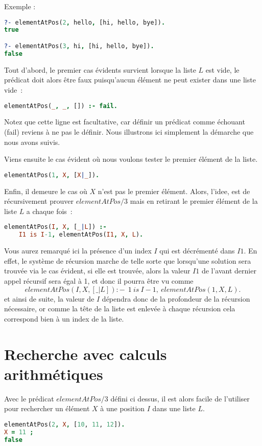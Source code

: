 Exemple :
\begin{lstlisting}[language=Prolog,frame=single]
?- elementAtPos(2, hello, [hi, hello, bye]).
true

?- elementAtPos(3, hi, [hi, hello, bye]).
false
\end{lstlisting}


Tout d'abord, le premier cas évidents survient lorsque la liste $L$ est vide, le
prédicat doit alors être faux puisqu'aucun élément ne peut exister dans une liste vide~:
\begin{lstlisting}[language=Prolog,frame=single]
elementAtPos(_, _, []) :- fail.
\end{lstlisting}
Notez que cette ligne est facultative, car définir un prédicat comme échouant
(fail) reviens à ne pas le définir. Nous illustrons ici simplement la démarche que nous avons suivis.

Viens ensuite le cas évident où nous voulons tester le premier élément de la
liste.
\begin{lstlisting}[language=Prolog,frame=single]
elementAtPos(1, X, [X|_]).
\end{lstlisting}

Enfin, il demeure le cas où $X$ n'est pas le premier élément. Alors, l'idee, est
de récursivement prouver $elementAtPos/3$ mais en retirant le premier élément de la liste $L$
a chaque fois~:
\begin{lstlisting}[language=Prolog,frame=single]
elementAtPos(I, X, [_|L]) :-
    I1 is I-1, elementAtPos(I1, X, L).
\end{lstlisting}
Vous aurez remarqué ici la présence d'un index $I$ qui est décrémenté dans $I1$. En effet, le système de récursion marche de telle sorte que lorsqu'une solution sera trouvée via le cas évident, si elle est trouvée, alors la valeur $I1$ de l'avant dernier appel récursif sera égal à 1, et donc il pourra être vu comme 
\[
elementAtPos(I, X, [\_|L]) :-\ \ 1\ is\ I-1,\ elementAtPos(1, X, L).
\] et ainsi de suite, la valeur de $I$ dépendra donc de la profondeur de la récursion nécessaire, or comme la tête de la liste est enlevée à chaque récursion cela correspond bien à un index de la liste. 

\section{Recherche avec calculs arithmétiques}

Avec le prédicat $elementAtPos/3$ défini ci dessus, il est alors facile de l'utiliser pour rechercher
un élément $X$ à une position $I$ dans une liste $L$.
\begin{lstlisting}[language=Prolog,frame=single]
elementAtPos(2, X, [10, 11, 12]).
X = 11 ;
false
\end{lstlisting}


